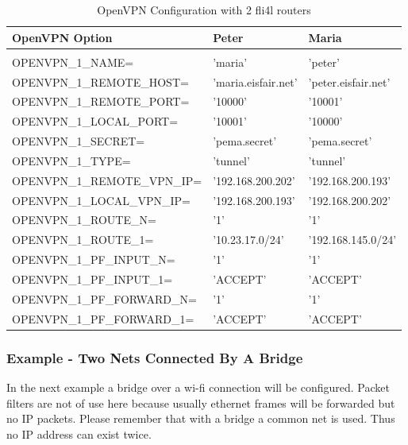 \begin{table}[htbp]
  \begin{scriptsize}
    \begin{tabular}{lll}
      OpenVPN Option                & Peter              & Maria               \\
      \hline \\
      OPENVPN\_1\_NAME=             & 'maria'            & 'peter'             \\
      OPENVPN\_1\_REMOTE\_HOST=     & 'maria.eisfair.net' & 'peter.eisfair.net' \\
      OPENVPN\_1\_REMOTE\_PORT=     & '10000'            & '10001'             \\
      OPENVPN\_1\_LOCAL\_PORT=      & '10001'            & '10000'             \\
      OPENVPN\_1\_SECRET=           & 'pema.secret'      & 'pema.secret'       \\
      OPENVPN\_1\_TYPE=             & 'tunnel'           & 'tunnel'            \\
      OPENVPN\_1\_REMOTE\_VPN\_IP=  & '192.168.200.202'  & '192.168.200.193'   \\
      OPENVPN\_1\_LOCAL\_VPN\_IP=   & '192.168.200.193'  & '192.168.200.202'   \\
      OPENVPN\_1\_ROUTE\_N=         & '1'                & '1'                 \\
      OPENVPN\_1\_ROUTE\_1=         & '10.23.17.0/24'    & '192.168.145.0/24'  \\
      OPENVPN\_1\_PF\_INPUT\_N=   & '1'                & '1'                 \\
      OPENVPN\_1\_PF\_INPUT\_1=   & 'ACCEPT'           & 'ACCEPT'            \\
      OPENVPN\_1\_PF\_FORWARD\_N= & '1'                & '1'                 \\
      OPENVPN\_1\_PF\_FORWARD\_1= & 'ACCEPT'  & 'ACCEPT' \\
    \end{tabular}
  \end{scriptsize}
  \caption{OpenVPN Configuration with 2 fli4l routers}
\end{table}

\subsubsection{Example - Two Nets Connected By A Bridge}

In the next example a bridge over a wi-fi connection will be configured. 
Packet filters are not of use here because usually ethernet frames will be 
forwarded but no IP packets. Please remember that with a bridge a common 
net is used. Thus no IP address can exist twice.


